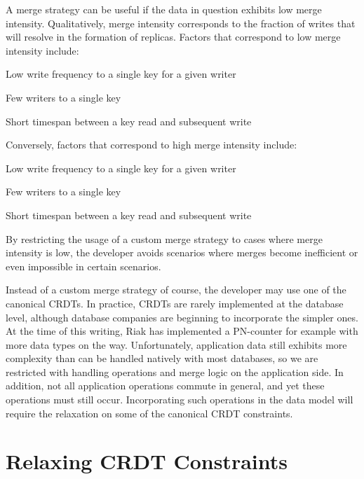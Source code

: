 \documentclass[twoside]{article}
\begin{document}
\begin{multicols}{2}
A merge strategy can be useful if the data in question exhibits low
merge intensity. Qualitatively, merge intensity corresponds to the
fraction of writes that will resolve in the formation of
replicas. Factors that correspond to low merge intensity include:
\begin{compactitem}
  \item Low write frequency to a single key for a given writer
  \item Few writers to a single key
  \item Short timespan between a key read and subsequent write
\end{compactitem}
Conversely, factors that correspond to high merge intensity include:
\begin{compactitem}
  \item Low write frequency to a single key for a given writer
  \item Few writers to a single key
  \item Short timespan between a key read and subsequent write
\end{compactitem}
By restricting the usage of a custom merge strategy to cases where
merge intensity is low, the developer avoids scenarios where merges
become inefficient or even impossible in certain scenarios.

Instead of a custom merge strategy of course, the developer may use
one of the canonical CRDTs. In practice, CRDTs are rarely implemented
at the database level, although database companies are beginning to
incorporate the simpler ones. At the time of this writing, Riak has
implemented a PN-counter for example \cite{riak2013} with more data
types on the way. Unfortunately, application data still exhibits more
complexity than can be handled natively with most databases, so we are
restricted with handling operations and merge logic on the application
side. In addition, not all application operations commute in general,
and yet these operations must still occur. Incorporating such
operations in the data model will require the relaxation on some of
the canonical CRDT constraints.


\section{Relaxing CRDT Constraints}


\end{multicols}
\end{document}

